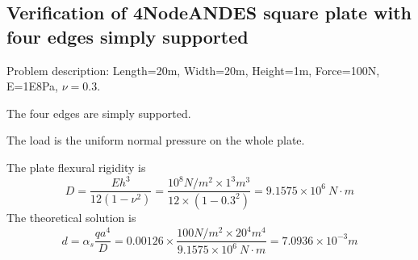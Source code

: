 \documentclass[fleqn,11pt,letter]{article}
\begin{document}











\newpage
\subsection{Verification of 4NodeANDES square plate with four edges simply supported}

Problem description: Length=20m, Width=20m, Height=1m, Force=100N, E=1E8Pa, $\nu=0.3$. 

The four edges are simply supported. 

The load is the uniform normal pressure on the whole plate. 

The plate flexural rigidity is 
\begin{equation}
  D=\frac{Eh^3}{12(1-\nu^2)}=\frac{10^8 N/m^2 \times 1^3 m^3 }{12 \times (1-0.3^2) }= 9.1575 \times 10^6 \ N\cdot m
\end{equation}
The theoretical solution is 
\begin{equation}
  d=\alpha_s \frac{q a^4}{D}=0.00126\times \frac{100 N/m^2 \times 20^4 m^4}{9.1575 \times 10^6 \ N\cdot m}=7.0936\times 10^{-3} m
\end{equation}
\end{document}
